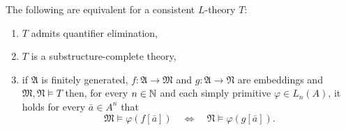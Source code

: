 \begin{lem}\label{lem:qelim}
	The following are equivalent for a consistent $L$-theory $T$:
	\begin{enumerate}
		\item	$T$ admits quantifier elimination,
		\item	$T$ is a substructure-complete theory,
		\item	if $\mathfrak{A}$ is finitely generated, $f\colon\mathfrak{A}\to\mathfrak{M}$ and $g\colon\mathfrak{A}\to\mathfrak{N}$ are embeddings and $\mathfrak{M},\mathfrak{N}\models T$ then, for every $n\in\mathbb{N}$ and each simply primitive $\varphi\in L_n(A)$, it holds for every $\bar{a}\in A^n$ that
		\begin{equation}
			\mathfrak{M}\models\varphi(f[\bar{a}]) \quad\iff\quad \mathfrak{N}\models\varphi(g[\bar{a}]).\label{eq:qelim}
		\end{equation}
	\end{enumerate}
\end{lem}
